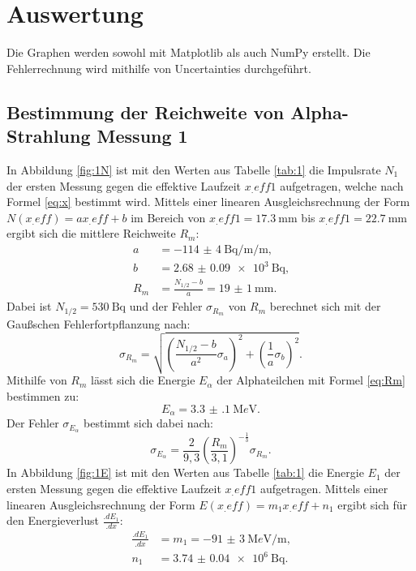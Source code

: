 \section{Auswertung}
\label{sec:Auswertung}

Die Graphen werden sowohl mit Matplotlib \cite{matplotlib} als auch NumPy \cite{numpy} erstellt. Die Fehlerrechnung wird mithilfe von Uncertainties \cite{uncertainties} durchgeführt.

\subsection{Bestimmung der Reichweite von Alpha-Strahlung Messung 1}

In Abbildung \ref{fig:1N} ist mit den Werten aus Tabelle \ref{tab:1} die Impulsrate $N_1$ der ersten Messung gegen die effektive Laufzeit $x_.{eff1}$ aufgetragen, welche nach Formel \eqref{eq:x} bestimmt wird.
Mittels einer linearen Ausgleichsrechnung der Form $N(x_.{eff})=a x_.{eff} +b$ im Bereich von $x_.{eff1} = \SI{17.3}{\milli\metre}$ bis $x_.{eff1} = \SI{22.7}{\milli\metre}$ ergibt sich die mittlere Reichweite $R_m$:
\begin{align*}
a	&= \SI{-114(4)}{\becquerel\per\milli\per\metre}\text{,}\\
b	&= \SI{2.68(9)e3}{\becquerel}\text{,}\\
R_m	&= \frac{N_{1/2}-b}{a} = \SI{19(1)}{\milli\metre}\text{.}
\end{align*}
Dabei ist $N_{1/2} = \SI{530}{\becquerel}$ und der Fehler $\sigma_{R_m}$ von $R_m$ berechnet sich mit der Gaußschen Fehlerfortpflanzung nach:
\begin{equation*}
\sigma_{R_m} = \sqrt{\left(\frac{N_{1/2}-b}{a^2}\sigma_a\right)^2+\left(\frac{1}{a}\sigma_b\right)^2}\text{.}
\end{equation*} 
Mithilfe von $R_m$ lässt sich die Energie $E_\alpha$ der Alphateilchen mit Formel \eqref{eq:Rm} bestimmen zu:
\begin{equation*}
E_\alpha = \SI{3.3(1)}{\mega e\volt}\text{.}
\end{equation*} 
Der Fehler $\sigma_{E_\alpha}$ bestimmt sich dabei nach:
\begin{equation*}
\sigma_{E_\alpha} = \frac{2}{9,3}\left(\frac{R_m}{3,1}\right)^{-\frac{1}{3}}\sigma_{R_m}\text{.}
\end{equation*} 
In Abbildung \ref{fig:1E} ist mit den Werten aus Tabelle \ref{tab:1} die Energie $E_1$ der ersten Messung gegen die effektive Laufzeit $x_.{eff1}$ aufgetragen.
Mittels einer linearen Ausgleichsrechnung der Form $E(x_.{eff})=m_1 x_.{eff} +n_1$ ergibt sich für den Energieverlust $\frac{.dE_1}{.dx}$:
\begin{align*}
\frac{.dE_1}{.dx}	&= m_1 = \SI{-91(3)}{\mega e\volt\per\metre}\text{,}\\
n_1	&= \SI{3.74(4)e6}{\becquerel}\text{.}
\end{align*}

